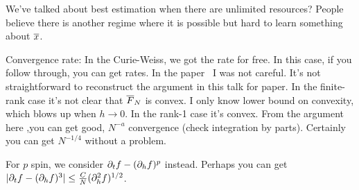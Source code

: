 We've talked about best estimation when there are unlimited resources? People believe there is another regime where it is possible but hard to learn something about $\overline{x}$.

Convergence rate: In the Curie-Weiss, we got the rate for free. In this case, if you follow through, you can get rates. In the paper~\cite{mourrat2019hamilton} I was not careful. %
It's not straightforward to reconstruct the argument in this talk for paper. In the finite-rank case it's not clear that $\overline{F}_N$ is convex. I only know lower bound on convexity, %
which blows up when $h\to 0$. In the rank-1 case it's convex. From the argument here ,you can get good, $N^{-a}$ convergence (check integration by parts). Certainly you can get $N^{-1/4}$ without a problem. 

For $p$ spin, we consider $\partial_t f - (\partial_h f)^p$ instead. Perhaps you can get $|\partial_t f-(\partial_h f)^3|\le \frac{C}{N} (\partial_h^2 f)^{1/2}$. 



